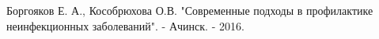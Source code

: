 \documentclass[a4paper,12pt]{article}
\theoremstyle{plain} %
\theoremstyle{definition} %
\theoremstyle{remark} %
\begin{document}
	\newpage

	\begin{thebibliography}{w:40}
		
		 Боргояков Е. А., Кособрюхова О.В. "Современные подходы в профилактике неинфекционных заболеваний". - Ачинск. - 2016.
		
	\end{thebibliography}
	
	
\end{document}
